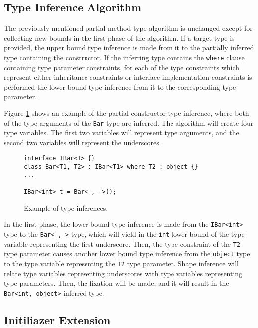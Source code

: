 \subsection{Type Inference Algorithm}

The previously mentioned partial method type algorithm is unchanged except for collecting new bounds in the first phase of the algorithm. 
If a target type is provided, the upper bound type inference is made from it to the partially inferred type containing the constructor. 
If the inferring type contains the \texttt{where} clause containing type parameter constraints, for each of the type constraints which represent either inheritance constraints or interface implementation constraints is performed the lower bound type inference from it to the corresponding type parameter.
\par
Figure \ref{img62:ctro} shows an example of the partial constructor type inference, where both of the type arguments of the \texttt{Bar} type are inferred. 
The algorithm will create four type variables. 
The first two variables will represent type arguments, and the second two variables will represent the underscores.
\begin{figure}[h!]
\begin{lstlisting}[style=csharp, mathescape=true]
interface IBar<T> {}
class Bar<T1, T2> : IBar<T1> where T2 : object {}
...

IBar<int> t = Bar<_, _>();
\end{lstlisting}
\caption{Example of type inferences.}
\label{img62:ctro}
\end{figure}
In the first phase, the lower bound type inference is made from the \texttt{IBar<int>} type to the \texttt{Bar<\_,\_>} type, which will yield in the \texttt{int} lower bound of the type variable representing the first underscore. 
Then, the type constraint of the \texttt{T2} type parameter causes another lower bound type inference from the \texttt{object} type to the type variable representing the \texttt{T2} type parameter. 
Shape inference will relate type variables representing underscores with type variables representing type parameters. 
Then, the fixation will be made, and it will result in the \texttt{Bar<int, object>} inferred type.

\subsection{Initiliazer Extension} \label{sect12:ex1}

